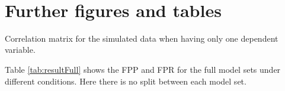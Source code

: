\\



%





%

\section{Further figures and tables}
Correlation matrix for the simulated data when having only one dependent variable. 



Table \ref{tab:resultFull} shows the FPP and FPR for the full model sets under different conditions. Here there is no split between each model set.



